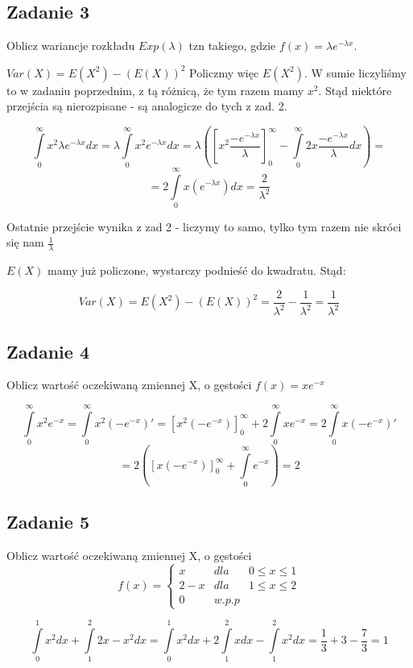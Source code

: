\documentclass[a4paper]{article}
\begin{document}
\subsection*{Zadanie 3}
Oblicz wariancje rozkładu $Exp(\lambda)$ tzn takiego, gdzie $f(x)=\lambda e^{-\lambda x}$.

$Var(X)=E(X^2)-(E(X))^2$
Policzmy więc $E(X^2)$. W sumie liczyliśmy to w zadaniu poprzednim, z tą różnicą, że tym razem mamy $x^2$. Stąd niektóre przejścia są nierozpisane - są analogicze do tych z zad. 2.

$$\int\limits_0^\infty x^2 \lambda e^{-\lambda x} dx = \lambda \int\limits_0^\infty x^2 e^{-\lambda x} dx = \lambda \left( \left[ x^2\frac{-e^{-\lambda x}}{\lambda} \right]_0^\infty - \int\limits_0^\infty 2x \frac{-e^{-\lambda x}}{\lambda} dx \right)=$$
$$=2\int\limits_0^\infty x (e^{-\lambda x}) dx = \frac{2}{\lambda^2}$$

Ostatnie przejście wynika z zad 2 - liczymy to samo, tylko tym razem nie skróci się nam $\frac{1}{\lambda}$

$E(X)$ mamy już policzone, wystarczy podnieść do kwadratu. Stąd:

$$Var(X)=E(X^2)-(E(X))^2 = \frac{2}{\lambda^2} - \frac{1}{\lambda^2} = \frac{1}{\lambda^2}$$

\subsection*{Zadanie 4}
Oblicz wartość oczekiwaną zmiennej X, o gęstości $f(x)=xe^{-x} $

$$\int\limits_0^\infty x^2 e^{-x} = \int\limits_0^\infty x^2 (-e^{-x})' = \left[ x^2(-e^{-x}) \right]_0^\infty + 2\int\limits_0^\infty x e^{-x} = 2\int\limits_0^\infty x (-e^{-x})'$$ 
$$=2\left( \left[ x(-e^{-x}) \right]_0^\infty + \int\limits_0^\infty e^{-x} \right) = 2$$

\subsection*{Zadanie 5}
Oblicz wartość oczekiwaną zmiennej X, o gęstości
$$f(x)=\left\{\begin{matrix}
x & dla  & 0\leq x\leq 1 \\ 
2-x & dla  & 1\leq x\leq 2 \\ 
0 & w.p.p  & 
\end{matrix}\right.$$

$$\int\limits_0^1 x^2 dx + \int\limits_1^2 2x-x^2 dx = \int\limits_0^1 x^2 dx + 2\int\limits_1^2 x dx - \int\limits_1^2 x^2 dx = \frac{1}{3} + 3 - \frac{7}{3} = 1$$
\end{document}
